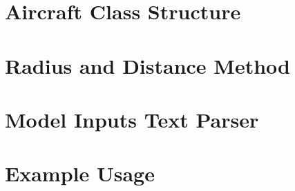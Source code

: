 \section{Aircraft Class Structure}


\renewcommand\thesection{\Alpha {B}}
\section{Radius and Distance Method}


\renewcommand\thesection{\Alpha {C}}
\section{Model Inputs Text Parser}


\renewcommand\thesection{\Alpha {D}}
\section{Example Usage}
